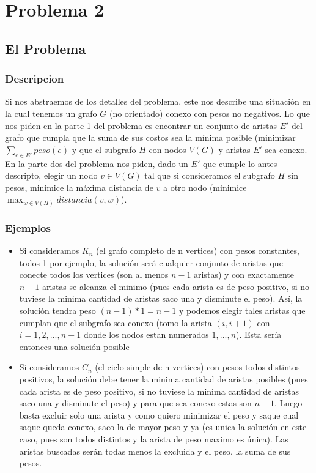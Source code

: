 \documentclass[A4paper,oneside,fleqn,11pt]{article}
\theoremstyle{definition}
\begin{document}
\section{Problema 2}
\subsection{El Problema}

\subsubsection{Descripcion}
Si nos abstraemos de los detalles del problema, este nos describe una situación en la cual tenemos un grafo $G$ (no orientado) conexo con pesos no negativos. Lo que nos piden en la parte 1 del problema es encontrar un conjunto de aristas $E'$ del grafo que cumpla que la suma de sus costos sea la mínima posible (minimizar $\sum_{e \in E'} {peso(e)}$ y que el subgrafo $H$ con nodos $V(G)$ y aristas $E'$ sea conexo. En la parte dos
del problema nos piden, dado un $E'$ que cumple lo antes descripto, elegir un nodo $v \in V(G)$ tal que si consideramos el subgrafo $H$ sin pesos, minimice la máxima distancia de $v$ a otro nodo (minimice $\max_{w\in V(H)}{distancia(v,w)}$).

\subsubsection{Ejemplos}
\begin{itemize}

\item Si consideramos $K_{n}$  (el grafo completo de n vertices) con pesos constantes, todos 1 por ejemplo, la solución será cualquier conjunto de aristas que conecte todos los vertices (son al menos $n-1$ aristas) y con exactamente $n-1$ aristas se alcanza el minimo (pues cada arista es de peso positivo, si no tuviese la minima cantidad de aristas saco una y disminute el peso). Así, la solución tendra peso $(n-1)*1=n-1$ y podemos elegir tales aristas que cumplan que el subgrafo sea conexo (tomo la arista $(i,i+1)$ con $i=1,2,...,n-1$ donde los nodos estan numerados $1,...,n$). Esta sería entonces una solución posible
\item Si consideramos $C_{n}$ (el ciclo simple de n vertices) con pesos todos distintos positivos, la solución debe tener la minima cantidad de aristas posibles (pues cada arista es de peso positivo, si no tuviese la minima cantidad de aristas saco una y disminute el peso) y para que sea conexo estas son $n-1$. Luego basta excluir solo una arista y como quiero minimizar el peso y saque cual saque queda conexo, saco la de mayor peso y ya (es unica la solución en este caso, pues son todos distintos y la  arista de peso maximo es única). Las aristas buscadas serán todas menos la excluida y el peso, la suma de sus pesos.

\end{itemize}
\end{document}
